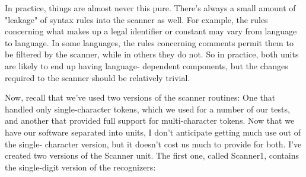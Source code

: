 \documentclass[float=false, crop=false]{standalone}
\begin{document}
In practice, things are almost never this pure. There's always a small amount of
"leakage" of syntax rules into the scanner as well. For example, the rules
concerning what makes up a legal identifier or constant may vary from language
to language. In some languages, the rules concerning comments permit them to be
filtered by the scanner, while in others they do not. So in practice, both units
are likely to end up having language- dependent components, but the changes
required to the scanner should be relatively trivial.

Now, recall that we've used two versions of the scanner routines: One that
handled only single-character tokens, which we used for a number of our tests,
and another that provided full support for multi-character tokens. Now that we
have our software separated into units, I don't anticipate getting much use out
of the single- character version, but it doesn't cost us much to provide for
both. I've created two versions of the Scanner unit. The first one, called
Scanner1, contains the single-digit version of the recognizers:
\end{document}
